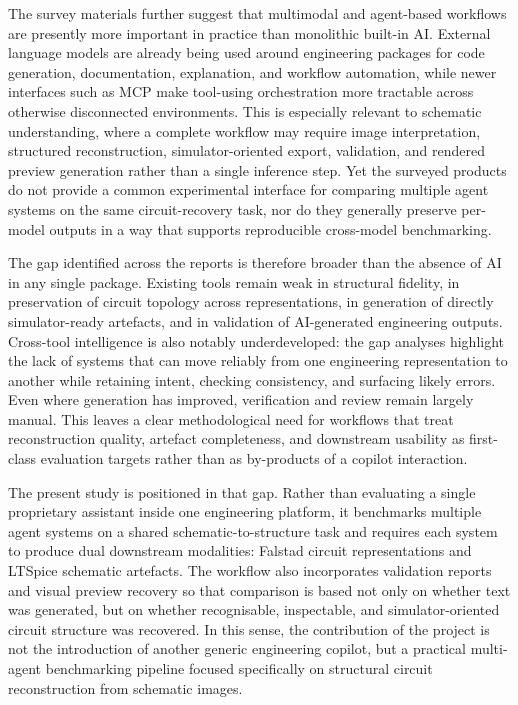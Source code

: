 The survey materials further suggest that multimodal and agent-based workflows are presently more important in practice than monolithic built-in AI. External language models are already being used around engineering packages for code generation, documentation, explanation, and workflow automation, while newer interfaces such as MCP make tool-using orchestration more tractable across otherwise disconnected environments. This is especially relevant to schematic understanding, where a complete workflow may require image interpretation, structured reconstruction, simulator-oriented export, validation, and rendered preview generation rather than a single inference step. Yet the surveyed products do not provide a common experimental interface for comparing multiple agent systems on the same circuit-recovery task, nor do they generally preserve per-model outputs in a way that supports reproducible cross-model benchmarking.

The gap identified across the reports is therefore broader than the absence of AI in any single package. Existing tools remain weak in structural fidelity, in preservation of circuit topology across representations, in generation of directly simulator-ready artefacts, and in validation of AI-generated engineering outputs. Cross-tool intelligence is also notably underdeveloped: the gap analyses highlight the lack of systems that can move reliably from one engineering representation to another while retaining intent, checking consistency, and surfacing likely errors. Even where generation has improved, verification and review remain largely manual. This leaves a clear methodological need for workflows that treat reconstruction quality, artefact completeness, and downstream usability as first-class evaluation targets rather than as by-products of a copilot interaction.

The present study is positioned in that gap. Rather than evaluating a single proprietary assistant inside one engineering platform, it benchmarks multiple agent systems on a shared schematic-to-structure task and requires each system to produce dual downstream modalities: Falstad circuit representations and LTSpice schematic artefacts. The workflow also incorporates validation reports and visual preview recovery so that comparison is based not only on whether text was generated, but on whether recognisable, inspectable, and simulator-oriented circuit structure was recovered. In this sense, the contribution of the project is not the introduction of another generic engineering copilot, but a practical multi-agent benchmarking pipeline focused specifically on structural circuit reconstruction from schematic images.
